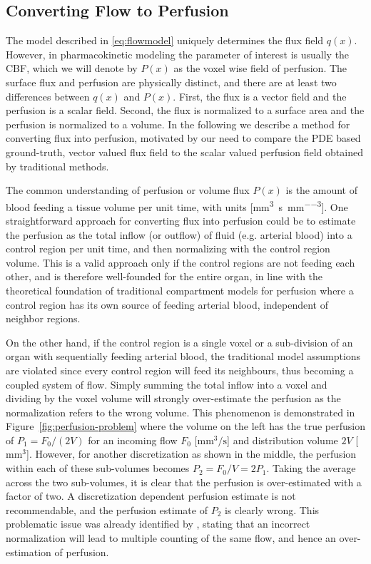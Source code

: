 \documentclass[journal,twocolumn]{IEEEtran}
\newcommand{\Perf}{P}
\newcommand{\Flow}{F}
\newcommand{\siFmm}{\milli\meter\cubed\per\second}
\newcommand{\siQmm}{\milli\meter\cubed\per\second\per\milli\meter\cubed}
\newcommand{\simm}{\milli\meter\cubed}
\begin{document}
	\subsection{Converting Flow to Perfusion}\label{sec:flux2perf}
	The model described in \eqref{eq:flowmodel} uniquely determines the flux field $q(x)$. 
	However, in pharmacokinetic modeling the parameter of interest is usually the CBF, which we will denote by $\Perf (x)$ as the voxel wise field of perfusion. The surface flux and perfusion are physically distinct, and there are at least two differences between $q(x)$ and $\Perf (x)$. 
	First, the flux is a vector field and the perfusion is a scalar field. 
	Second, the flux is normalized to a surface area and the perfusion is normalized to a volume. 
	In the following we describe a method for converting flux into perfusion, motivated by our need to compare the PDE based ground-truth, vector valued flux field to the scalar valued perfusion field obtained by traditional methods.

	The common understanding of perfusion or volume flux $\Perf (x)$ is the amount of blood feeding a tissue volume per unit time, with units [\si{\siQmm}]. 
	One straightforward approach for converting flux into perfusion could be to estimate the perfusion as the total inflow (or outflow) of fluid (e.g. arterial blood) into a control region per unit time, and then normalizing with the control region volume. 
	This is a valid approach only if the control regions are not feeding each other, and is therefore well-founded for the entire organ,
	in line with the theoretical foundation of traditional compartment models for perfusion where a control region has its own source of feeding arterial blood, independent of neighbor regions. 
	
	On the other hand, if the control region is a single voxel or a sub-division of an organ with sequentially feeding arterial blood, the traditional model assumptions are violated since every control region will feed its neighbours, thus becoming a coupled system of flow. 
	Simply summing the total inflow into a voxel and dividing by the voxel volume will strongly over-estimate the perfusion as the normalization refers to the wrong volume. 
	This phenomenon is demonstrated in Figure~\ref{fig:perfusion-problem} where the volume on the left has the true perfusion of $\Perf_{1} = \Flow_0 /(2V)$ for an incoming flow $\Flow_0$ [$\si{\siFmm}$] and distribution volume $2V$ [$\si{\simm}$]. 
	However, for another discretization as shown in the middle, the perfusion within each of these sub-volumes becomes $\Perf_{2} = F_0/V = 2\Perf_{1}$. 
	Taking the average across the two sub-volumes, it is clear that the perfusion is over-estimated with a factor of two. 
	A discretization dependent perfusion estimate is not recommendable, and the perfusion estimate of $\Perf_{2}$ is clearly wrong. 
	This problematic issue was already identified by \cite{Henkelman1990}, stating that an incorrect normalization will lead to multiple counting of the same flow, and hence an over-estimation of perfusion.
\end{document}
